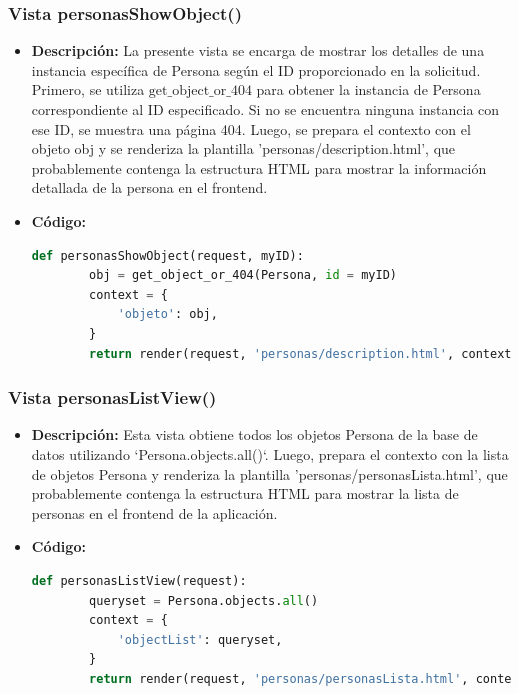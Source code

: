 \documentclass{article}
\begin{document}
  \subsubsection{Vista personasShowObject()}
  \begin{itemize}
    \item \textbf{Descripción: }La presente vista se encarga de mostrar los detalles de una instancia específica de Persona según el 
    ID proporcionado en la solicitud. Primero, se utiliza $\text{get\_object\_or\_404}$ para obtener la instancia de Persona correspondiente al 
    ID especificado. Si no se encuentra ninguna instancia con ese ID, se muestra una página 404.
    \newline
    Luego, se prepara el contexto con el objeto obj y se renderiza la plantilla 'personas/description.html', que probablemente contenga 
    la estructura HTML para mostrar la información detallada de la persona en el frontend.
    \item \textbf{Código: }
    \begin{lstlisting}[language=Python]
      def personasShowObject(request, myID):
        obj = get_object_or_404(Persona, id = myID)
        context = {
            'objeto': obj,
        }
        return render(request, 'personas/description.html', context)
    \end{lstlisting}   
  \end{itemize}
  
  
  \subsubsection{Vista personasListView()}
  \begin{itemize}
    \item \textbf{Descripción: }Esta vista obtiene todos los objetos Persona de la base de datos utilizando `Persona.objects.all()`.
    Luego, prepara el contexto con la lista de objetos Persona y renderiza la plantilla 'personas/personasLista.html', 
    que probablemente contenga la estructura HTML para mostrar la lista de personas en el frontend de la aplicación.
    \item \textbf{Código: }
    \begin{lstlisting}[language=Python]
      def personasListView(request):
        queryset = Persona.objects.all()
        context = {
            'objectList': queryset,
        }
        return render(request, 'personas/personasLista.html', context)
    \end{lstlisting}   
  \end{itemize}
  
\end{document}
